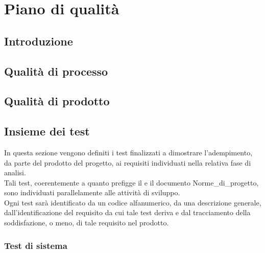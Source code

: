 \chapter{Piano di qualità}

\section{Introduzione}

\section{Qualità di processo}

\section{Qualità di prodotto}

\section{Insieme dei test} \label{sec:test}
In questa sezione vengono definiti i test finalizzati a dimostrare l'adempimento, da parte del prodotto del progetto, ai requisiti individuati nella relativa fase di analisi.\\
Tali test, coerentemente a quanto prefigge il  e il documento Norme\_di\_progetto, sono individuati parallelamente alle attività di sviluppo.\\
Ogni test sarà identificato da un codice alfanumerico, da una descrizione generale, dall'identificazione del requisito da cui tale test deriva e dal tracciamento della soddisfazione, o meno, di tale requisito nel prodotto.

\subsection{Test di sistema}

